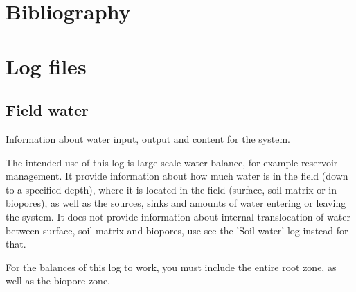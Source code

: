 \documentclass[a4paper]{article}
\begin{document}
\section{Bibliography}


\section{Log files}
\label{app:logs}

\subsection{Field water}
\label{model:log-Field water}

Information about water input, output and content for the system.

The intended use of this log is large scale water balance, for
example reservoir management. It provide information about how
much water is in the field (down to a specified depth), where it
is located in the field (surface, soil matrix or in biopores), as
well as the sources, sinks and amounts of water entering or
leaving the system.  It does not provide information about
internal translocation of water between surface, soil matrix and
biopores, use see the 'Soil water' log instead for that.

For the balances of this log to work, you must include the entire
root zone, as well as the biopore zone.
\end{document}

